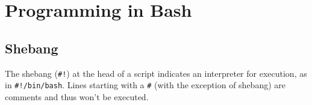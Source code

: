 \section{Programming in Bash}
\subsection{Shebang}
The shebang (\texttt{\#!}) at the head of a script indicates an 
interpreter for execution, as in \texttt{\#!/bin/bash}.
Lines starting with a \texttt{\#} (with the exception of shebang) 
are comments and thus won't be executed.
